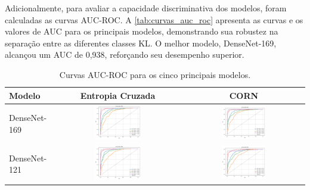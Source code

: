 Adicionalmente, para avaliar a capacidade discriminativa dos modelos, foram calculadas as curvas AUC-ROC. A \autoref{tab:curvas_auc_roc} apresenta as curvas e os valores de AUC para os principais modelos, demonstrando sua robustez na separação entre as diferentes classes KL. O melhor modelo, DenseNet-169, alcançou um AUC de 0,938, reforçando seu desempenho superior.

\begin{table}[!htbp]
    \centering
    \caption{Curvas AUC-ROC para os cinco principais modelos.}
    \label{tab:curvas_auc_roc}
    \begin{tabular}{|l|c|c|}
        \hline
        \textbf{Modelo} & \textbf{Entropia Cruzada} & \textbf{CORN} \\ \hline
        DenseNet-169 & \includegraphics[width=0.38\textwidth]{figs/auc_roc/densenet169_auc_roc_cross_entropy.png} & \includegraphics[width=0.38\textwidth]{figs/auc_roc/densenet169_auc_roc_corn.png} \\ \hline
        DenseNet-121 & \includegraphics[width=0.38\textwidth]{figs/auc_roc/densenet121_auc_roc_cross_entropy.png} & \includegraphics[width=0.38\textwidth]{figs/auc_roc/densenet121_auc_roc_corn.png} \\ \hline

\end{tabular}
\end{table}
